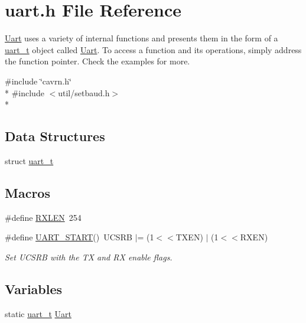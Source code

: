 \hypertarget{a00016}{\section{uart.\-h File Reference}
\label{a00016}
}


\hyperlink{a00009}{Uart} uses a variety of internal functions and presents them in the form of a \hyperlink{a00010}{uart\-\_\-t} object called \hyperlink{a00009}{Uart}. To access a function and its operations, simply address the function pointer. Check the examples for more.  


{\ttfamily \#include \char`\"{}cavrn.\-h\char`\"{}}\\*
{\ttfamily \#include $<$util/setbaud.\-h$>$}\\*
\subsection*{Data Structures}
\begin{DoxyCompactItemize}
\item 
struct \hyperlink{a00010}{uart\-\_\-t}
\end{DoxyCompactItemize}
\subsection*{Macros}
\begin{DoxyCompactItemize}
\item 
\#define \hyperlink{a00016_aeff6b6e5cf8852475fab3f5b2f5baff1}{R\-X\-L\-E\-N}~254
\item 
\#define \hyperlink{a00016_ab7251398c6f91aa49b6a638f2b0d0614}{U\-A\-R\-T\-\_\-\-S\-T\-A\-R\-T}()~U\-C\-S\-R\-B $\vert$= (1$<$$<$T\-X\-E\-N) $\vert$ (1$<$$<$R\-X\-E\-N)
\begin{DoxyCompactList}\small\item\em Set U\-C\-S\-R\-B with the T\-X and R\-X enable flags. \end{DoxyCompactList}\end{DoxyCompactItemize}
\subsection*{Variables}
\begin{DoxyCompactItemize}
\item 
static \hyperlink{a00010}{uart\-\_\-t} \hyperlink{a00016_aedc3c4ab9d8b22838e2796525ae2e707}{Uart}
\end{DoxyCompactItemize}


